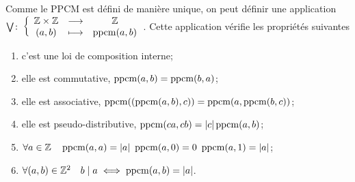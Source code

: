 \begin{prop}
  Comme le PPCM est défini de manière unique, on peut définir une application
  \(\fonction{\bigvee}{\Z\times\Z}{\Z}{(a,b)}{\ppcm(a,b)}\). Cette application
  vérifie les propriétés suivantes
  \begin{enumerate}
    \item c'est une loi de composition interne;
    \item elle est commutative, \(\ppcm(a,b)=\ppcm(b,a)\);
    \item elle est associative, \(\ppcm((\ppcm(a,b),c))=\ppcm(a,\ppcm(b,c))\);
    \item elle est pseudo-distributive, \(\ppcm(ca,cb)=\abs{c}\ppcm(a,b)\);
    \item \(\forall a \in \Z \quad \ppcm(a,a)=\abs{a} \ \ppcm(a,0) = 0 \
      \ppcm(a,1)=\abs{a}\);
    \item \(\forall (a,b) \in \Z^2 \quad b\mid a \iff \ppcm(a,b)=\abs{a}\).
  \end{enumerate}
\end{prop}


